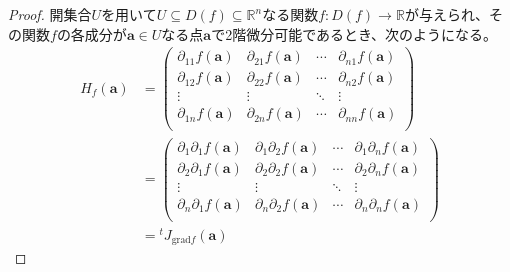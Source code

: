 \documentclass[dvipdfmx]{jsarticle}
\begin{document}
\begin{proof}
開集合$U$を用いて$U \subseteq D(f) \subseteq \mathbb{R}^{n}$なる関数$f:D(f) \rightarrow \mathbb{R}$が与えられ、その関数$f$の各成分が$\mathbf{a} \in U$なる点$\mathbf{a}$で2階微分可能であるとき、次のようになる。
\begin{align*}
H_{f}\left( \mathbf{a} \right) &= \begin{pmatrix}
\partial_{11}f\left( \mathbf{a} \right) & \partial_{21}f\left( \mathbf{a} \right) & \cdots & \partial_{n1}f\left( \mathbf{a} \right) \\
\partial_{12}f\left( \mathbf{a} \right) & \partial_{22}f\left( \mathbf{a} \right) & \cdots & \partial_{n2}f\left( \mathbf{a} \right) \\
 \vdots & \vdots & \ddots & \vdots \\
\partial_{1n}f\left( \mathbf{a} \right) & \partial_{2n}f\left( \mathbf{a} \right) & \cdots & \partial_{nn}f\left( \mathbf{a} \right) \\
\end{pmatrix}\\
&= \begin{pmatrix}
\partial_{1}\partial_{1}f\left( \mathbf{a} \right) & \partial_{1}\partial_{2}f\left( \mathbf{a} \right) & \cdots & \partial_{1}\partial_{n}f\left( \mathbf{a} \right) \\
\partial_{2}\partial_{1}f\left( \mathbf{a} \right) & \partial_{2}\partial_{2}f\left( \mathbf{a} \right) & \cdots & \partial_{2}\partial_{n}f\left( \mathbf{a} \right) \\
 \vdots & \vdots & \ddots & \vdots \\
\partial_{n}\partial_{1}f\left( \mathbf{a} \right) & \partial_{n}\partial_{2}f\left( \mathbf{a} \right) & \cdots & \partial_{n}\partial_{n}f\left( \mathbf{a} \right) \\
\end{pmatrix}\\
&={}^{t}J_{\mathrm{grad}f}\left( \mathbf{a} \right)
\end{align*}
\end{proof}
\end{document}
